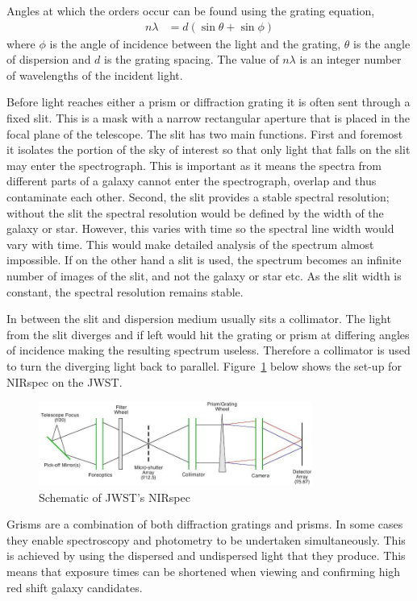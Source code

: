 	Angles at which the orders occur can be found using the grating equation\cite{DiffGrating},
	\begin{align}
		n\lambda &= d(\sin\theta + \sin\phi)
	\end{align}
	where $\phi$ is the angle of incidence between the light and the grating, $\theta$ is the angle of dispersion and $d$ is the grating spacing. The value of $n\lambda$ is an integer number of wavelengths of the incident light.

	Before light reaches either a prism or diffraction grating it is often sent through a fixed slit. This is a mask with a narrow rectangular aperture that is placed in the focal plane of the telescope. The slit has two main functions. First and foremost it isolates the portion of the sky of interest so that only light that falls on the slit may enter the spectrograph. This is important as it means the spectra from different parts of a galaxy cannot enter the spectrograph, overlap and thus contaminate each other. Second, the slit provides a stable spectral resolution; without the slit the spectral resolution would be defined by the width of the galaxy or star. However, this varies with time so the spectral line width would vary with time. This would make detailed analysis of the spectrum almost impossible. If on the other hand a slit is used, the spectrum becomes an infinite number of images of the slit, and not the galaxy or star etc. As the slit width is constant, the spectral resolution remains stable\cite{SpectoG}.

	In between the slit and dispersion medium usually sits a collimator. The light from the slit diverges and if left would hit the grating or prism at differing angles of incidence making the resulting spectrum useless. Therefore a collimator is used to turn the diverging light back to parallel. Figure~\ref{fig:nirspec_jwst} below shows the set-up for NIRspec on the JWST.
	\begin{figure}[htbp]
		\centering
			\includegraphics[width=0.8\textwidth]{../Images/nirspec_jwst.jpeg}
		\caption{\label{fig:nirspec_jwst} Schematic of JWST's NIRspec}
	\end{figure}

	Grisms are a combination of both diffraction gratings and prisms. In some cases they enable spectroscopy and photometry to be undertaken simultaneously. This is achieved by using the dispersed and undispersed light that they produce. This means that exposure times can be shortened when viewing and confirming high red shift galaxy candidates.

